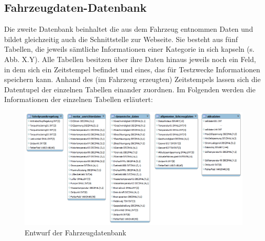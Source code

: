 \documentclass[fontsize = 12pt, paper = a4]{scrreprt}
\begin{document}
\subsection{Fahrzeugdaten-Datenbank}

Die zweite Datenbank beinhaltet die aus dem Fahrzeug entnommen Daten und bildet gleichzeitig auch die Schnittstelle zur Webseite. Sie besteht aus fünf Tabellen, die jeweils sämtliche Informationen einer Kategorie in sich kapseln (s. Abb. X.Y). Alle Tabellen besitzen über ihre Daten hinaus jeweils noch ein Feld, in dem sich ein Zeitstempel befindet und eines, das für Testzwecke Informationen speichern kann. Anhand des (im Fahrzeug erzeugten) Zeitstempels lassen sich die Datentupel der einzelnen Tabellen einander zuordnen. Im Folgenden werden die Informationen der einzelnen Tabellen erläutert:

\begin{figure}[h]
\centering
\includegraphics[scale = 0.43]{fahrzeugdatenbank} %
\caption{Entwurf der Fahrzeugdatenbank}
\end{figure} 
\end{document}
